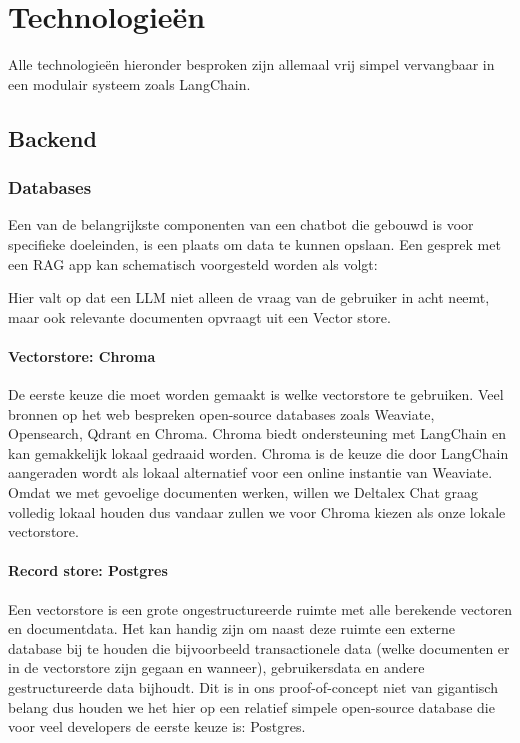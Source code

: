 \chapter{Technologieën}
\label{ch:technologies}
Alle technologieën hieronder besproken zijn allemaal vrij simpel vervangbaar in een modulair systeem zoals LangChain.

\section{Backend}
\subsection{Databases}
Een van de belangrijkste componenten van een chatbot die gebouwd is voor specifieke doeleinden, is een plaats om data te kunnen opslaan.
Een gesprek met een RAG app kan schematisch voorgesteld worden als volgt:

\begin{figure}[h]
\end{figure}

Hier valt op dat een LLM niet alleen de vraag van de gebruiker in acht neemt, maar ook relevante documenten opvraagt uit een Vector store. 

\subsubsection{Vectorstore: Chroma}
De eerste keuze die moet worden gemaakt is welke vectorstore te gebruiken. Veel bronnen op het web bespreken open-source databases zoals Weaviate, Opensearch, Qdrant en Chroma. 
Chroma biedt ondersteuning met LangChain en kan gemakkelijk lokaal gedraaid worden. 
Chroma is de keuze die door LangChain aangeraden wordt als lokaal alternatief voor een online instantie van Weaviate.  
Omdat we met gevoelige documenten werken, willen we Deltalex Chat graag volledig lokaal houden dus vandaar zullen we voor Chroma kiezen als onze lokale vectorstore. 

\subsubsection{Record store: Postgres}
Een vectorstore is een grote ongestructureerde ruimte met alle berekende vectoren en documentdata. 
Het kan handig zijn om naast deze ruimte een externe database bij te houden die bijvoorbeeld transactionele data (welke documenten er in de vectorstore zijn gegaan en wanneer), 
gebruikersdata en andere gestructureerde data bijhoudt. Dit is in ons proof-of-concept niet van gigantisch belang dus houden we het hier op een relatief simpele open-source database  
die voor veel developers de eerste keuze is: Postgres. 

